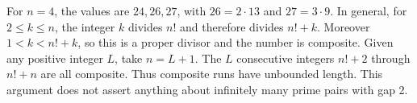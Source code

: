 For $n=4$, the values are $24,26,27$, with $26=2\cdot13$ and $27=3\cdot9$. In general, for $2\le k\le n$, the integer $k$ divides $n!$ and therefore divides $n!+k$. Moreover $1<k<n!+k$, so this is a proper divisor and the number is composite. Given any positive integer $L$, take $n=L+1$. The $L$ consecutive integers $n!+2$ through $n!+n$ are all composite. Thus composite runs have unbounded length. This argument does not assert anything about infinitely many prime pairs with gap 2.
